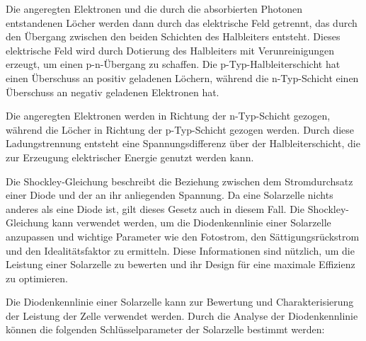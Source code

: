 \documentclass[12pt,english,ngerman]{scrartcl}
\begin{document}
Die angeregten Elektronen und die durch die absorbierten Photonen entstandenen
Löcher werden dann durch das elektrische Feld getrennt, das durch den Übergang
zwischen den beiden Schichten des Halbleiters entsteht. Dieses elektrische Feld
wird durch Dotierung des Halbleiters mit Verunreinigungen erzeugt, um einen
p-n-Übergang zu schaffen. Die p-Typ-Halbleiterschicht hat einen Überschuss an
positiv geladenen Löchern, während die n-Typ-Schicht einen Überschuss an
negativ geladenen Elektronen hat.

Die angeregten Elektronen werden in Richtung der n-Typ-Schicht gezogen, während
die Löcher in Richtung der p-Typ-Schicht gezogen werden. Durch diese
Ladungstrennung entsteht eine Spannungsdifferenz über der Halbleiterschicht,
die zur Erzeugung elektrischer Energie genutzt werden kann.

Die Shockley-Gleichung beschreibt die Beziehung zwischen dem Stromdurchsatz
einer Diode und der an ihr anliegenden Spannung. Da eine Solarzelle nichts
anderes als eine Diode ist, gilt dieses Gesetz auch in diesem Fall. Die
Shockley-Gleichung kann verwendet werden, um die Diodenkennlinie einer
Solarzelle anzupassen und wichtige Parameter wie den Fotostrom, den
Sättigungsrückstrom und den Idealitätsfaktor zu ermitteln. Diese Informationen
sind nützlich, um die Leistung einer Solarzelle zu bewerten und ihr Design für
eine maximale Effizienz zu optimieren.

Die Diodenkennlinie einer Solarzelle kann zur Bewertung und Charakterisierung
der Leistung der Zelle verwendet werden. Durch die Analyse der Diodenkennlinie
können die folgenden Schlüsselparameter der Solarzelle bestimmt werden:
\end{document}
